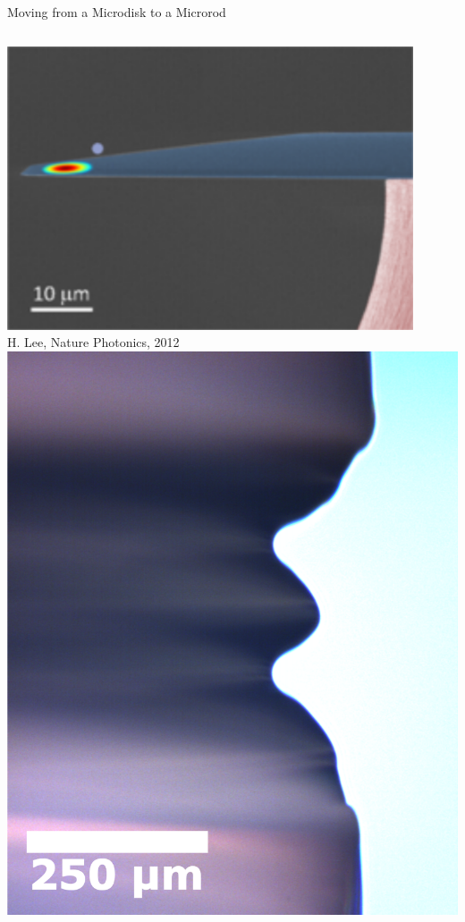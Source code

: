 \documentclass{beamer}
\begin{document}
\begin{frame}
\begin{block}{Moving from a Microdisk to a Microrod}
\begin{columns}
\begin{center}
\includegraphics[width=0.9\textwidth]{Images/Microdisk_Profile.png}\\
\footnotesize{H. Lee, Nature Photonics, 2012}\\
\includegraphics[width=1.0\textwidth,keepaspectratio]{Images/Microrod_Profile.png}
\end{center}


\end{columns}
\end{block}
\end{frame}
\end{document}
